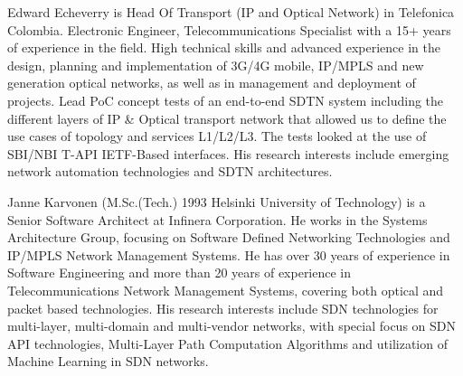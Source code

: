 \documentclass[a4paper,fleqn]{cas-dc}
\begin{document}
Edward Echeverry is Head Of Transport (IP and Optical Network) in Telefonica Colombia. Electronic Engineer, Telecommunications Specialist with a 15+ years of experience in the field. High technical skills and advanced experience in the design, planning and implementation of 3G/4G mobile, IP/MPLS and new generation optical networks, as well as in management and deployment of projects. Lead PoC concept tests of an end-to-end SDTN system including the different layers of IP \& Optical transport network that allowed us to define the use cases of topology and services L1/L2/L3. The tests looked at the use of SBI/NBI T-API IETF-Based interfaces. His research interests include emerging network automation technologies and SDTN architectures.
\endbio

Janne Karvonen (M.Sc.(Tech.) 1993 Helsinki University of Technology) is a Senior Software Architect at Infinera Corporation. He works in the Systems Architecture Group, focusing on Software Defined Networking Technologies and IP/MPLS Network Management Systems. He has over 30 years of experience in Software Engineering and more than 20 years of experience in Telecommunications Network Management Systems, covering both optical and packet based technologies. His research interests include SDN technologies for multi-layer, multi-domain and multi-vendor networks, with special focus on SDN API technologies, Multi-Layer Path Computation Algorithms and utilization of Machine Learning in SDN networks.
\endbio
\end{document}
